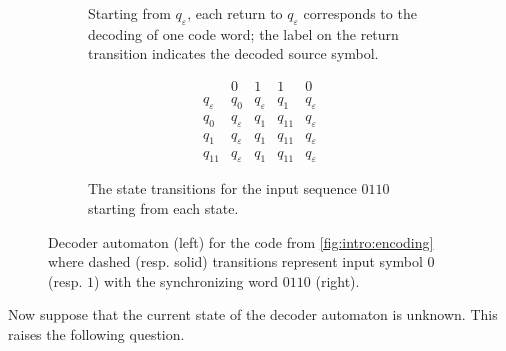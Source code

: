 \begin{figure}[ht]
\begin{subfigure}[b]{.6\textwidth}
		\caption{Starting from $q_{\varepsilon}$, each return to $q_{\varepsilon}$ 
			corresponds to the decoding of one code word; the label on the return transition indicates the decoded source symbol.
		}
	\label{intro:subfig:decoder}	
\end{subfigure}%
\hfill
\begin{subfigure}[b]{0.35\textwidth}
	\centering
	\[
	\begin{array}{l|lllll}
		& 0 & 1 & 1 & 0 \\ \hline       
		q_{\varepsilon} & q_0 & q_{\varepsilon} & q_1 & q_{\varepsilon}  \\
		q_{0}           & q_{\varepsilon} & q_{1} & q_{11} & q_{\varepsilon} \\
		q_1             & q_{\varepsilon} & q_1   & q_{11} & q_{\varepsilon} \\
		q_{11}          & q_{\varepsilon} & q_1   & q_{11} & q_{\varepsilon}
	\end{array}
	\]
	\caption{The state transitions for the input sequence $0110$ starting from each state.}
	\label{intro:fig:decoder:syncsequence}
\end{subfigure}
\caption[Introductory decoder automaton]{Decoder automaton (left) 
	for the code from \cref{fig:intro:encoding}
	where dashed (resp. solid) transitions represent input symbol $0$ (resp. $1$)
	with the synchronizing word $0110$ (right).} 
\label{intro:fig:decoder}	
\end{figure}

Now suppose that the current state of the decoder automaton is unknown. This raises the following question.

\smallskip
\begin{center}
\end{center}
\smallskip

